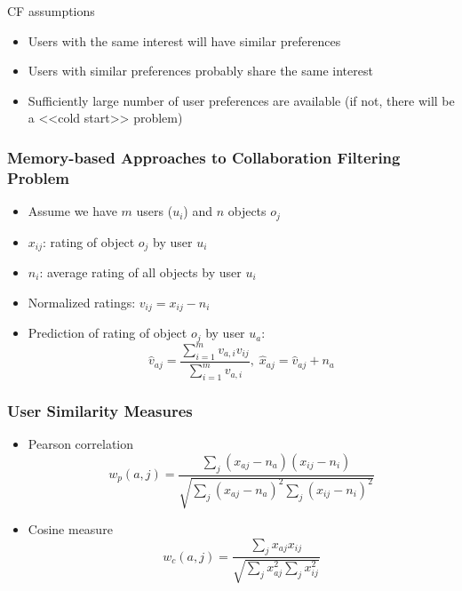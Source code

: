 CF assumptions
\begin{itemize}
\item Users with the same interest will have similar preferences
\item Users with similar preferences probably share the same interest
\item Sufficiently large number of user preferences are available (if not, there will be a <<cold start>> problem)
\end{itemize}


\newpage
\subsubsection{Memory-based Approaches to Collaboration Filtering Problem}


\begin{itemize}
\item Assume we have $m$ users ($u_i$) and $n$ objects $o_j$
\item $x_{ij}$: rating of object $o_j$ by user $u_i$
\item $n_i$: average rating of all objects by user $u_i$ 
\item Normalized ratings: $v_{ij} = x_{ij} - n_i$
\item Prediction of rating of object $o_j$ by user $u_a$:
\begin{equation*}
\hat{v}_{aj} = \frac{\sum\limits_{i=1}^m v_{a,i} v_{ij}}{\sum\limits_{i=1}^m v_{a,i}}, \;\hat{x}_{aj} = \hat{v}_{aj} + n_a
\end{equation*}
\end{itemize}



\subsubsection{User Similarity Measures}
\begin{itemize}
\item Pearson correlation
\begin{equation*}
w_p(a, j) = \frac{\sum_j (x_{aj} - n_a)(x_{ij} - n_i)}{\sqrt{\sum_j (x_{aj} - n_a)^2 \sum_j(x_{ij} - n_i)^2}}
\end{equation*}

\item Cosine measure
\begin{equation*}
w_c(a, j) = \frac{\sum_j x_{aj} x_{ij}}{\sqrt{\sum_j x_{aj}^2 \sum_j x_{ij}^2}}
\end{equation*}
\end{itemize}



